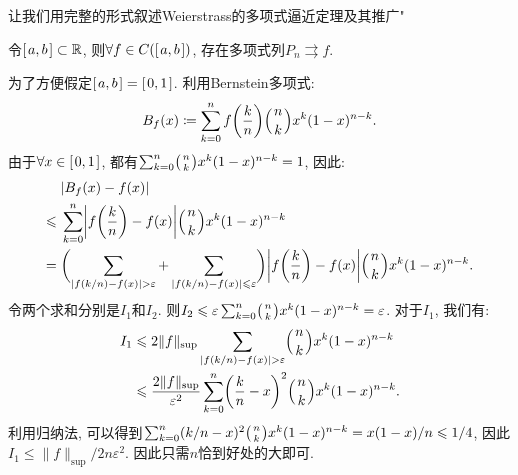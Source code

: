 \documentclass{MeasureClay}
\makeatletter
\renewenvironment{proof}[1][\proofname]{\par
\pushQED{\qed}%
\small\normalfont \topsep6\p@\@plus6\p@\relax
\trivlist%
\item\relax%
{\itshape%
#1\@addpunct{.}}\hspace\labelsep\ignorespaces
}{%
\popQED\endtrivlist\@endpefalse
}
\makeatother
\begin{document}
让我们用完整的形式叙述Weierstrass的多项式逼近定理及其推广"
\begin{theorem}[Weierstrass多项式逼近定理]
    令$[\.a,b\.]\subset\mathbb R$, 则$\forall f\in C([\.a,b\.])$, 存在多项式列$P_n\rightrightarrows f$.
\end{theorem}
\begin{proof}
    为了方便假定$[\.a,b\.]=[\.0,1\.]$. 利用Bernstein多项式:
    \[B_f(x)\coloneqq \sum_{k=0}^n f\biggl(\frac{k}{n}\biggr)\Bigl({n \atop k}\Bigr)x^k(1-x)^{n-k}.\]
    由于$\forall x\in[\.0,1\.]$, 都有$\sum_{k=0}^n\bigl({n \atop k}\bigr)x^k(1-x)^{n-k}=1$, 因此:
    \[
        \begin{aligned}
                        & |B_f(x) - f(x)|                                                                                                                                                         \\
            \leqslant{} & \sum_{k=0}^n \biggl|f\biggl(\frac{k}{n}\biggr)-f(x)\biggr|\Bigl({n \atop k}\Bigr)x^k(1-x)^{n-k}                                                                         \\
            ={}         & \biggl(\sum_{|f(k / n)-f(x)|>\varepsilon}+\sum_{|f(k / n)-f(x)|\leqslant \varepsilon}\biggr)\biggl|f\biggl(\frac{k}{n}\biggr)-f(x)\biggr|\Bigl({n \atop k}\Bigr)x^k(1-x)^{n-k}. \\
        \end{aligned}
    \]
    令两个求和分别是$I_1$和$I_2$. 则$I_2\leqslant \varepsilon\sum_{k=0}^n\bigl({n \atop k}\bigr)x^k(1-x)^{n-k}=\varepsilon$. 对于$I_1$, 我们有:
    \[
        \begin{aligned}
            I_1&\leqslant 2\|f\|_{\sup}\sum_{|f(k / n)-f(x)|>\varepsilon}\Bigl({n \atop k}\Bigr)x^k(1-x)^{n-k}\\
            &\leqslant \frac{2\|f\|_{\sup}}{\varepsilon^2}\sum_{k=0}^n\biggl(\frac{k}{n}-x\biggr)^2\Bigl({n \atop k}\Bigr)x^k(1-x)^{n-k}. \\ 
        \end{aligned}
    \]
    利用归纳法, 可以得到$\sum_{k=0}^n(k / n-x)^2\bigl({n \atop k}\bigr)x^k(1-x)^{n-k}=x(1-x) / n\leqslant 1/4$, 因此$I_1\leqslant \|f\|_{\sup} / 2n\varepsilon^2$. 因此只需$n$恰到好处的大即可.
\end{proof}


% 
% 
% 
% 
% 
% 
% 
% 
\end{document}
